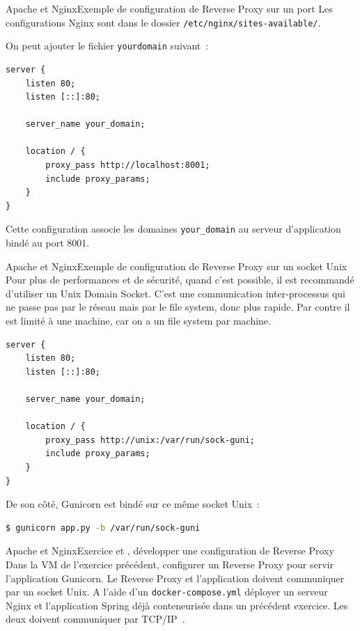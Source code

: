 \documentclass{beamer}
\begin{document}
    \begin{frame}[fragile]{Apache et Nginx}{Exemple de configuration de Reverse Proxy sur un port}
        Les configurations Nginx sont dans le dossier \lstinline{/etc/nginx/sites-available/}.

        On peut ajouter le fichier \lstinline{yourdomain} suivant~:
        \begin{lstlisting}
server {
    listen 80;
    listen [::]:80;

    server_name your_domain;

    location / {
        proxy_pass http://localhost:8001;
        include proxy_params;
    }
}
        \end{lstlisting}
        Cette configuration associe les domaines \lstinline{your_domain} au serveur d'application bindé au port 8001.
    \end{frame}

    \begin{frame}[fragile]{Apache et Nginx}{Exemple de configuration de Reverse Proxy sur un socket Unix}
        Pour plus de performances et de sécurité, quand c'est possible, il est recommandé d'utiliser un Unix Domain Socket.
        C'est une communication inter-processus qui ne passe pas par le réseau mais par le file system, donc plus rapide.
        Par contre il est limité à une machine, car on a un file system par machine.
        \begin{lstlisting}
server {
    listen 80;
    listen [::]:80;

    server_name your_domain;

    location / {
        proxy_pass http://unix:/var/run/sock-guni;
        include proxy_params;
    }
}
        \end{lstlisting}
        De son côté, Gunicorn est bindé sur ce même socket Unix~:
        \begin{lstlisting}[language=bash]
$ gunicorn app.py -b /var/run/sock-guni
        \end{lstlisting}
    \end{frame}

    \begin{frame}{Apache et Nginx}{Exercice \execcounterdispinc{} et \execcounterdispinc{}, développer une configuration de Reverse Proxy}
        \setlength\parindent{24pt}
        Dans la VM de l'exercice précédent, configurer un Reverse Proxy pour servir l'application Gunicorn.
        Le Reverse Proxy et l'application doivent communiquer par un socket Unix.
        \bigbreak
        A l'aide d'un \lstinline{docker-compose.yml} déployer un serveur Nginx et l'application Spring déjà conteneurisée dans un précédent exercice.
        Les deux doivent communiquer par TCP/IP~.
        \setlength\parindent{0pt}
    \end{frame}
\end{document}
